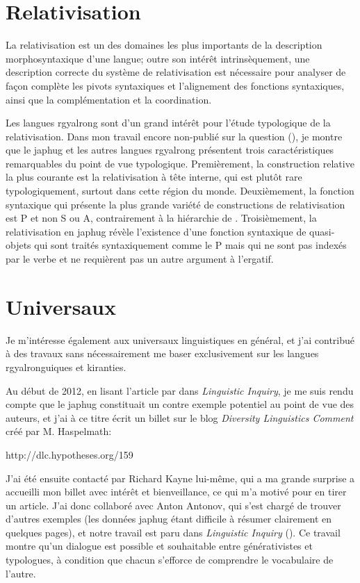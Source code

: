 \documentclass[oldfontcommands,oneside,a4paper,11pt]{memoir}
\begin{document}
\section{Relativisation}
La relativisation est un des domaines les plus importants de la description morphosyntaxique d'une langue; outre son intérêt intrinsèquement, une description correcte du système de  relativisation est nécessaire pour analyser de façon complète les pivots syntaxiques et l'alignement des fonctions syntaxiques, ainsi que la complémentation et la coordination.

Les langues rgyalrong sont d'un grand intérêt pour l'étude typologique de la relativisation. Dans mon travail encore non-publié sur la question (\citealt{jacques14relatives}), je montre que le japhug et les autres langues rgyalrong présentent trois caractéristiques remarquables du point de vue typologique. Premièrement, la construction relative la plus courante est la relativisation à tête interne, qui est plutôt rare typologiquement, surtout dans cette région du monde. Deuxièmement, la fonction syntaxique qui présente la plus grande variété de constructions de relativisation est P et non S ou A, contrairement à la hiérarchie de \citet{keenan77accessibility}. Troisièmement, la relativisation en japhug révèle l'existence d'une fonction syntaxique de quasi-objets qui sont traités syntaxiquement comme le P mais qui ne sont pas indexés par le verbe et ne requièrent pas un autre argument à l'ergatif.

\section{Universaux}
Je m'intéresse également aux universaux linguistiques en général, et j'ai contribué à des travaux sans nécessairement me baser exclusivement sur les langues rgyalronguiques et kiranties.

Au début de 2012, en lisant l'article \citet{harves12need} par dans \textit{Linguistic Inquiry}, je me suis rendu compte que le japhug constituait un contre exemple potentiel au point de vue des auteurs, et j'ai à ce titre écrit un billet sur le blog \textit{Diversity Linguistics Comment} créé par M. Haspelmath: 

http://dlc.hypotheses.org/159

J'ai été ensuite contacté par Richard Kayne lui-même, qui a ma grande surprise a accueilli mon billet avec intérêt et bienveillance, ce qui m'a motivé pour en tirer un article. J'ai donc collaboré avec Anton Antonov, qui s'est chargé de trouver d'autres exemples (les données japhug étant difficile à résumer clairement en quelques pages), et notre travail est paru dans \textit{Linguistic Inquiry} (\citealt{antonov14need}). Ce travail montre qu'un dialogue est possible et souhaitable entre générativistes et typologues, à condition que chacun s'efforce de comprendre le vocabulaire de l'autre.
\end{document}
